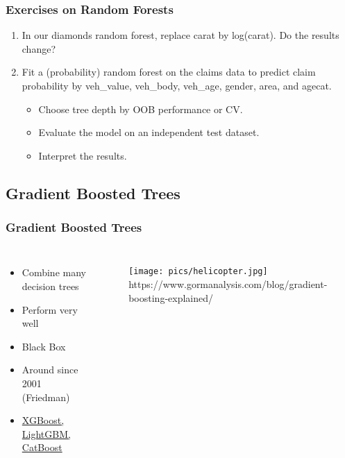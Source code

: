 \documentclass[
    utf8,
    aspectratio=169
]{beamer}  %
\begin{document}
\begin{frame}
	\frametitle{Exercises on Random Forests}
	\begin{enumerate}
		\item In our diamonds random forest, replace carat by log(carat). Do the results change?
		
		\vfill
		
		\item Fit a (probability) random forest on the claims data to predict claim probability by {\ttfamily veh\_value}, {\ttfamily veh\_body}, {\ttfamily veh\_age}, {\ttfamily gender}, {\ttfamily area}, and {\ttfamily agecat}.
		\begin{itemize}
			\item Choose tree depth by OOB performance or CV.
			\item Evaluate the model on an independent test dataset.
			\item Interpret the results.
		\end{itemize}
	\end{enumerate}
\end{frame}

\subsection{Gradient Boosted Trees}

\begin{frame}
	\frametitle{Gradient Boosted Trees}
	\begin{columns}[onlytextwidth]
		\begin{itemize}
			\item Combine many decision trees
			\item Perform very well
			\item Black Box
			\item Around since 2001 (Friedman)
			\item \href{https://github.com/mayer79/gradient_boosting_comparison}{XGBoost, LightGBM, CatBoost}
		\end{itemize}
		
		\begin{figure}
			\texttt{[image: pics/helicopter.jpg]}
			\tiny{https://www.gormanalysis.com/blog/gradient-boosting-explained/}
		\end{figure}
	\end{columns}
\end{frame}
\end{document}
